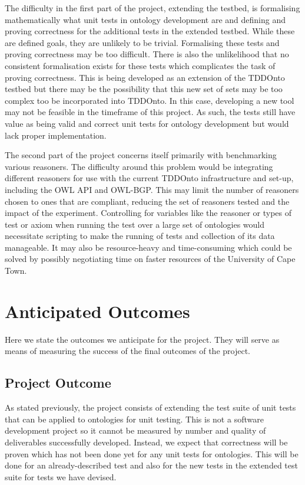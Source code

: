 \documentclass[draft]{sig-alternate}
\begin{document}
The difficulty in the first part of the project, extending the testbed, is formalising mathematically what unit tests in ontology development are and defining and proving correctness for the additional tests in the extended testbed. While these are defined goals, they are unlikely to be trivial. Formalising these tests and proving correctness may be too difficult. There is also the unlikelihood that no consistent formalisation exists for these tests which complicates the task of proving correctness. This is being developed as an extension of the TDDOnto testbed but there may be the possibility that this new set of sets may be too complex too be incorporated into TDDOnto. In this case, developing a new tool may not be feasible in the timeframe of this project. As such, the tests still have value as being valid and correct unit tests for ontology development but would lack proper implementation.

The second part of the project concerns itself primarily with benchmarking various reasoners. The difficulty around this problem would be integrating different reasoners for use with the current TDDOnto infrastructure and set-up, including the OWL API and OWL-BGP. This may limit the number of reasoners chosen to ones that are compliant, reducing the set of reasoners tested and the impact of the experiment. Controlling for variables like the reasoner or types of test or axiom when running the test over a large set of ontologies would necessitate scripting to make the running of tests and collection of its data manageable. It may also be resource-heavy and time-consuming which could be solved by possibly negotiating time on faster resources of the University of Cape Town.

\section{Anticipated Outcomes}

Here we state the outcomes we anticipate for the project. They will serve as means of measuring the success of the final outcomes of the project.

\subsection{Project Outcome}

As stated previously, the project consists of extending the test suite of unit tests that can be applied to ontologies for unit testing. This is not a software development project so it cannot be measured by number and quality of deliverables successfully developed. Instead, we expect that correctness will be proven which has not been done yet for any unit tests for ontologies. This will be done for an already-described test and also for the new tests in the extended test suite for tests we have devised.
\end{document}
